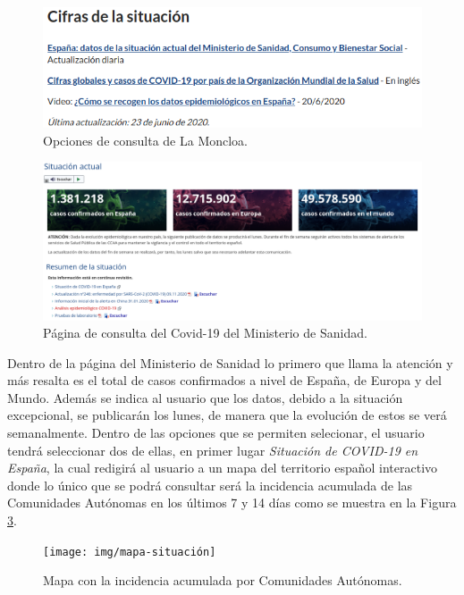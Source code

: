 \begin{figure}[H]
	\centering
	\includegraphics[width=1\textwidth]{img/opciones-moncloa}
	\caption{Opciones de consulta de La Moncloa.}
	\label{fig:opciones-moncloa}
\end{figure}

\begin{figure}[H]
	\centering
	\includegraphics[width=1\textwidth]{img/ministerio-salud}
	\caption{Página de consulta del Covid-19 del Ministerio de Sanidad.}
	\label{fig:ministerio-salud}
\end{figure}

Dentro de la página del Ministerio de Sanidad lo primero que llama la atención y más resalta es el total de casos confirmados a nivel de España, de Europa y del Mundo. Además se indica al usuario que los datos, debido a la situación excepcional, se publicarán los lunes, de manera que la evolución de estos se verá semanalmente. Dentro de las opciones que se permiten selecionar, el usuario tendrá seleccionar dos de ellas, en primer lugar \textit{Situación de COVID-19 en España}, la cual redigirá al usuario a un mapa del territorio español interactivo donde lo único que se podrá consultar será la incidencia acumulada de las Comunidades Autónomas en los últimos 7 y 14 días como se muestra en la Figura \ref{fig:mapa-situacion}.

\begin{figure}[H]
	\centering
	\texttt{[image: img/mapa-situación]}
	\caption{Mapa con la incidencia acumulada por Comunidades Autónomas.}
	\label{fig:mapa-situacion}
\end{figure}

